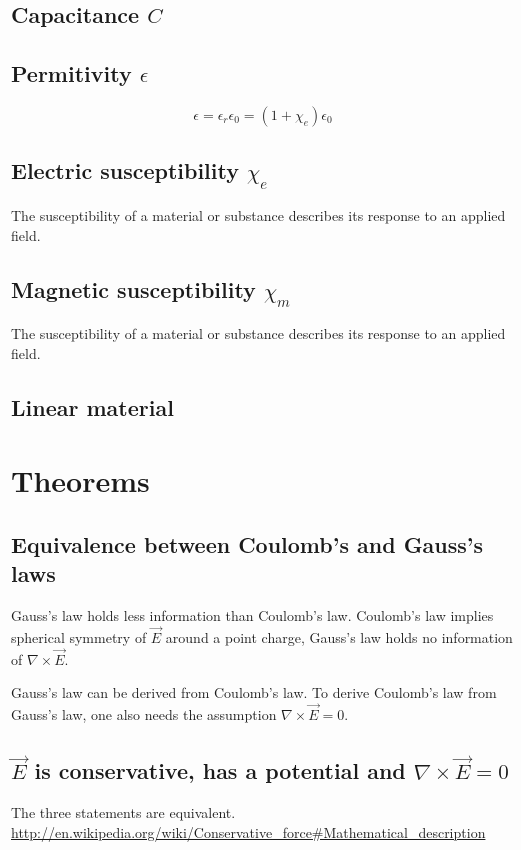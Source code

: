\subsection{Capacitance $C$}
\label{def:capacitance}

\subsection{Permitivity $\epsilon$}
\begin{equation*}
  \epsilon = \epsilon_r\epsilon_0 = (1+\chi_e)\epsilon_0
\end{equation*}

\subsection{Electric susceptibility $\chi_e$}
The susceptibility of a material or substance describes its response
to an applied field.

\subsection{Magnetic susceptibility $\chi_m$}
The susceptibility of a material or substance describes its response
to an applied field.

\subsection{Linear material}


\section{Theorems}


\subsection{Equivalence between Coulomb's and Gauss's laws}
\label{thm:coulomb-gauss}
Gauss's law holds less information than Coulomb's law. Coulomb's law
implies spherical symmetry of $\vec{E}$ around a point charge, Gauss's
law holds no information of $\nabla\times\vec{E}$.

Gauss's law can be derived from Coulomb's law. To derive Coulomb's law
from Gauss's law, one also needs the assumption $\nabla\times\vec{E}=0$.


\subsection{$\vec{E}$ is conservative, has a potential and
  $\nabla\times\vec{E}=0$}
\label{thm:conservative}
The three statements are equivalent. \url{http://en.wikipedia.org/wiki/Conservative_force#Mathematical_description}


